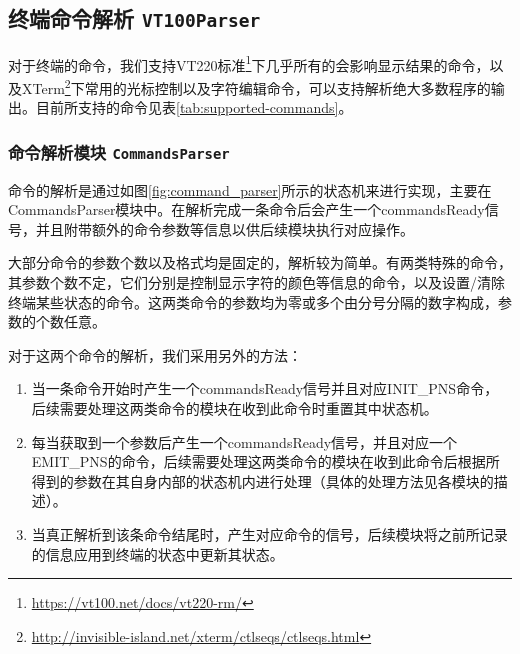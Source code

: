  
\subsection{终端命令解析 \texttt{VT100Parser}}

对于终端的命令，我们支持VT220标准\footnote{\url{https://vt100.net/docs/vt220-rm/}}下几乎所有的会影响显示结果的命令，以及XTerm\footnote{\url{http://invisible-island.net/xterm/ctlseqs/ctlseqs.html}}下常用的光标控制以及字符编辑命令，可以支持解析绝大多数程序的输出。目前所支持的命令见表\ref{tab:supported-commands}。


\subsubsection{命令解析模块 \texttt{CommandsParser}}
命令的解析是通过如图\ref{fig:command_parser}所示的状态机来进行实现，主要在CommandsParser模块中。在解析完成一条命令后会产生一个commandsReady信号，并且附带额外的命令参数等信息以供后续模块执行对应操作。

大部分命令的参数个数以及格式均是固定的，解析较为简单。有两类特殊的命令，其参数个数不定，它们分别是控制显示字符的颜色等信息的命令，以及设置/清除终端某些状态的命令。这两类命令的参数均为零或多个由分号分隔的数字构成，参数的个数任意。

对于这两个命令的解析，我们采用另外的方法：

\begin{enumerate}
	\item 当一条命令开始时产生一个commandsReady信号并且对应INIT\_PNS命令，后续需要处理这两类命令的模块在收到此命令时重置其中状态机。
	\item 每当获取到一个参数后产生一个commandsReady信号，并且对应一个EMIT\_PNS的命令，后续需要处理这两类命令的模块在收到此命令后根据所得到的参数在其自身内部的状态机内进行处理（具体的处理方法见各模块的描述）。
	\item 当真正解析到该条命令结尾时，产生对应命令的信号，后续模块将之前所记录的信息应用到终端的状态中更新其状态。
\end{enumerate}

